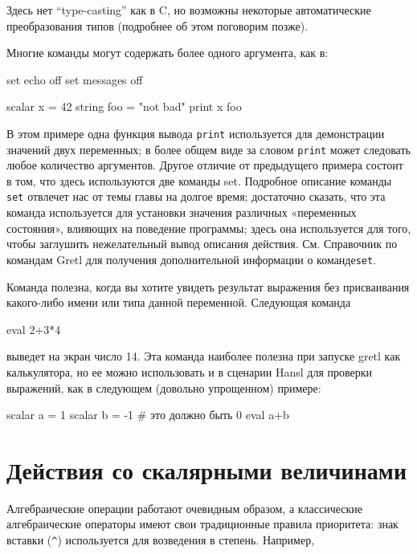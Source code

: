 Здесь нет ``type-casting'' как в C, но возможны некоторые
автоматические преобразования типов (подробнее об этом поговорим
позже).

Многие команды могут содержать более одного аргумента, как в:
\begin{code}
  set echo off
  set messages off

  scalar x = 42
  string foo = "not bad"
  print x foo 
\end{code}
В этом примере одна функция вывода \texttt{print} используется для
демонстрации значений двух переменных; в более общем виде за словом
\texttt{print} может следовать любое количество аргументов. Другое
отличие от предыдущего примера состоит в том, что здесь используются
две команды set. Подробное описание команды \texttt{set} отвлечет нас
от темы главы на долгое время; достаточно сказать, что эта команда
используется для установки значения различных «переменных состояния»,
влияющих на поведение программы; здесь она используется для того,
чтобы заглушить нежелательный вывод описания действия. См. Справочник
по командам Gretl для получения дополнительной информации о
команде\texttt{set}.


Команда  полезна, когда вы хотите увидеть результат
выражения без присваивания какого-либо имени или типа данной
переменной. Следующая команда
\begin{code}
  eval 2+3*4
\end{code}
выведет на экран число 14. Эта команда наиболее полезна при запуске
gretl как калькулятора, но ее можно использовать и в сценарии Hansl
для проверки выражений, как в следующем (довольно упрощенном) примере:
\begin{code}
  scalar a = 1
  scalar b = -1
  # это должно быть 0
  eval a+b
\end{code}

\section{Действия со скалярными величинами}

Алгебраические операции работают очевидным образом, а классические
алгебраические операторы имеют свои традиционные правила приоритета:
знак вставки (\verb|^|) используется для возведения в
степень. Например,

